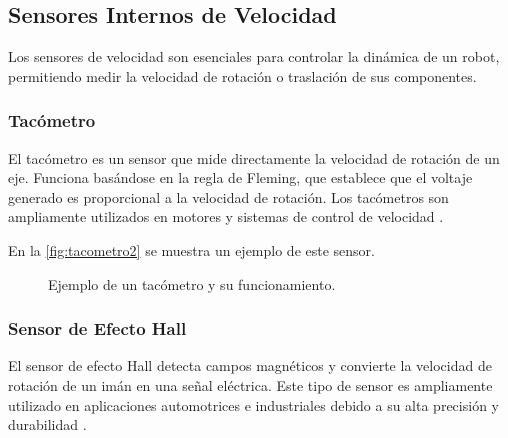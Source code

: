\subsection{Sensores Internos de Velocidad}

Los sensores de velocidad son esenciales para controlar la dinámica de un robot, permitiendo medir la velocidad de rotación o traslación de sus componentes.

\subsubsection{Tacómetro}
El tacómetro es un sensor que mide directamente la velocidad de rotación de un eje. Funciona basándose en la regla de Fleming, que establece que el voltaje generado es proporcional a la velocidad de rotación. Los tacómetros son ampliamente utilizados en motores y sistemas de control de velocidad \cite{Acelerometro}.

En la \autoref{fig:tacometro2} se muestra un ejemplo de este sensor.

\begin{figure}[h!]
	\centering
	\caption{Ejemplo de un tacómetro y su funcionamiento.}
	\label{fig:tacometro2}
\end{figure}

\subsubsection{Sensor de Efecto Hall}
El sensor de efecto Hall detecta campos magnéticos y convierte la velocidad de rotación de un imán en una señal eléctrica. Este tipo de sensor es ampliamente utilizado en aplicaciones automotrices e industriales debido a su alta precisión y durabilidad \cite{EfectoHall}.

